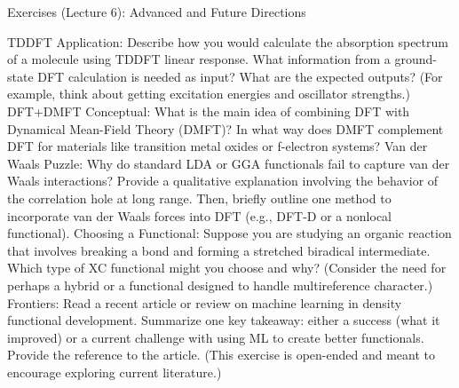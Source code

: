 Exercises (Lecture 6): Advanced and Future Directions

TDDFT Application: Describe how you would calculate the absorption spectrum of a molecule using TDDFT linear response. What information from a ground-state DFT calculation is needed as input? What are the expected outputs? (For example, think about getting excitation energies and oscillator strengths.)
DFT+DMFT Conceptual: What is the main idea of combining DFT with Dynamical Mean-Field Theory (DMFT)? In what way does DMFT complement DFT for materials like transition metal oxides or f-electron systems?
Van der Waals Puzzle: Why do standard LDA or GGA functionals fail to capture van der Waals interactions? Provide a qualitative explanation involving the behavior of the correlation hole at long range. Then, briefly outline one method to incorporate van der Waals forces into DFT (e.g., DFT-D or a nonlocal functional).
Choosing a Functional: Suppose you are studying an organic reaction that involves breaking a bond and forming a stretched biradical intermediate. Which type of XC functional might you choose and why? (Consider the need for perhaps a hybrid or a functional designed to handle multireference character.)
Frontiers: Read a recent article or review on machine learning in density functional development. Summarize one key takeaway: either a success (what it improved) or a current challenge with using ML to create better functionals. Provide the reference to the article. (This exercise is open-ended and meant to encourage exploring current literature.)




